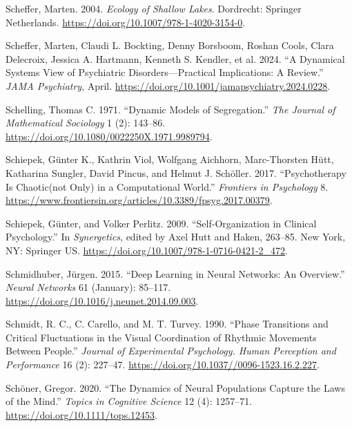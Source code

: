 \documentclass[
  a4paper,
  DIV=11,
  numbers=noendperiod,
  oneside]{scrreprt}
\newlength{\cslhangindent}
\newenvironment{CSLReferences}[2] %
 {\begin{list}{}{%
  \setlength{\itemindent}{0pt}
  \setlength{\leftmargin}{0pt}
  \setlength{\parsep}{0pt}
  \ifodd #1
   \setlength{\leftmargin}{\cslhangindent}
   \setlength{\itemindent}{-1\cslhangindent}
  \fi
  \setlength{\itemsep}{#2\baselineskip}}}
 {\end{list}}
\begin{document}
\begin{CSLReferences}{1}{0}
Scheffer, Marten. 2004. \emph{Ecology of {Shallow Lakes}}. {Dordrecht}:
{Springer Netherlands}. \url{https://doi.org/10.1007/978-1-4020-3154-0}.

Scheffer, Marten, Claudi L. Bockting, Denny Borsboom, Roshan Cools,
Clara Delecroix, Jessica A. Hartmann, Kenneth S. Kendler, et al. 2024.
{``A {Dynamical Systems View} of {Psychiatric Disorders}---{Practical
Implications}: {A Review}.''} \emph{JAMA Psychiatry}, April.
\url{https://doi.org/10.1001/jamapsychiatry.2024.0228}.

Schelling, Thomas C. 1971. {``Dynamic Models of Segregation.''}
\emph{The Journal of Mathematical Sociology} 1 (2): 143--86.
\url{https://doi.org/10.1080/0022250X.1971.9989794}.

Schiepek, Günter K., Kathrin Viol, Wolfgang Aichhorn, Marc-Thorsten
Hütt, Katharina Sungler, David Pincus, and Helmut J. Schöller. 2017.
{``Psychotherapy Is Chaotic{\textemdash}(not Only) in a Computational
World.''} \emph{Frontiers in Psychology} 8.
\url{https://www.frontiersin.org/articles/10.3389/fpsyg.2017.00379}.

Schiepek, Günter, and Volker Perlitz. 2009. {``Self-{Organization} in
{Clinical Psychology}.''} In \emph{Synergetics}, edited by Axel Hutt and
Haken, 263--85. {New York, NY}: {Springer US}.
\url{https://doi.org/10.1007/978-1-0716-0421-2_472}.

Schmidhuber, Jürgen. 2015. {``Deep Learning in Neural Networks: {An}
Overview.''} \emph{Neural Networks} 61 (January): 85--117.
\url{https://doi.org/10.1016/j.neunet.2014.09.003}.

Schmidt, R. C., C. Carello, and M. T. Turvey. 1990. {``Phase Transitions
and Critical Fluctuations in the Visual Coordination of Rhythmic
Movements Between People.''} \emph{Journal of Experimental Psychology.
Human Perception and Performance} 16 (2): 227--47.
\url{https://doi.org/10.1037//0096-1523.16.2.227}.

Schöner, Gregor. 2020. {``The {Dynamics} of {Neural Populations Capture}
the {Laws} of the {Mind}.''} \emph{Topics in Cognitive Science} 12 (4):
1257--71. \url{https://doi.org/10.1111/tops.12453}.


\end{CSLReferences}
\end{document}
